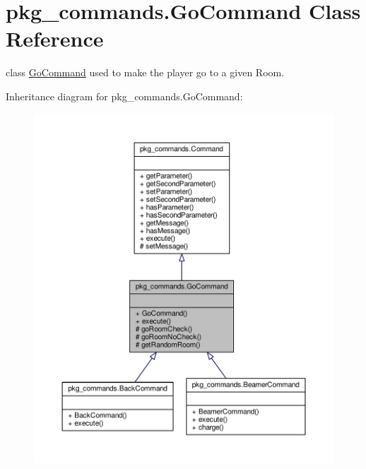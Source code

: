 \hypertarget{classpkg__commands_1_1GoCommand}{\section{pkg\-\_\-commands.\-Go\-Command Class Reference}
\label{classpkg__commands_1_1GoCommand}
}


class \hyperlink{classpkg__commands_1_1GoCommand}{Go\-Command} used to make the player go to a given Room.  




Inheritance diagram for pkg\-\_\-commands.\-Go\-Command\-:
\nopagebreak
\begin{figure}[H]
\begin{center}
\leavevmode
\includegraphics[width=350pt]{classpkg__commands_1_1GoCommand__inherit__graph}
\end{center}
\end{figure}


